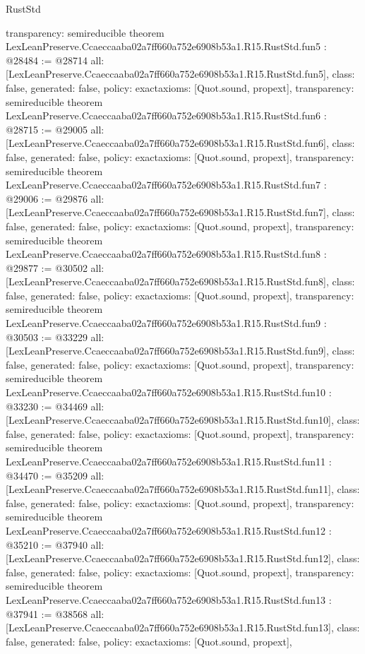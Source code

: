 \begin{lexlean}{RustStd}
\begin{coremodule}
{  transparency: semireducible
}
theorem LexLeanPreserve.Ccaeccaaba02a7ff660a752e6908b53a1.R15.RustStd.fun5 : @28484 := @28714 {
  all: [LexLeanPreserve.Ccaeccaaba02a7ff660a752e6908b53a1.R15.RustStd.fun5],
  class: false,
  generated: false,
  policy: exact{axioms: [Quot.sound, propext]},
  transparency: semireducible
}
theorem LexLeanPreserve.Ccaeccaaba02a7ff660a752e6908b53a1.R15.RustStd.fun6 : @28715 := @29005 {
  all: [LexLeanPreserve.Ccaeccaaba02a7ff660a752e6908b53a1.R15.RustStd.fun6],
  class: false,
  generated: false,
  policy: exact{axioms: [Quot.sound, propext]},
  transparency: semireducible
}
theorem LexLeanPreserve.Ccaeccaaba02a7ff660a752e6908b53a1.R15.RustStd.fun7 : @29006 := @29876 {
  all: [LexLeanPreserve.Ccaeccaaba02a7ff660a752e6908b53a1.R15.RustStd.fun7],
  class: false,
  generated: false,
  policy: exact{axioms: [Quot.sound, propext]},
  transparency: semireducible
}
theorem LexLeanPreserve.Ccaeccaaba02a7ff660a752e6908b53a1.R15.RustStd.fun8 : @29877 := @30502 {
  all: [LexLeanPreserve.Ccaeccaaba02a7ff660a752e6908b53a1.R15.RustStd.fun8],
  class: false,
  generated: false,
  policy: exact{axioms: [Quot.sound, propext]},
  transparency: semireducible
}
theorem LexLeanPreserve.Ccaeccaaba02a7ff660a752e6908b53a1.R15.RustStd.fun9 : @30503 := @33229 {
  all: [LexLeanPreserve.Ccaeccaaba02a7ff660a752e6908b53a1.R15.RustStd.fun9],
  class: false,
  generated: false,
  policy: exact{axioms: [Quot.sound, propext]},
  transparency: semireducible
}
theorem LexLeanPreserve.Ccaeccaaba02a7ff660a752e6908b53a1.R15.RustStd.fun10 : @33230 := @34469 {
  all: [LexLeanPreserve.Ccaeccaaba02a7ff660a752e6908b53a1.R15.RustStd.fun10],
  class: false,
  generated: false,
  policy: exact{axioms: [Quot.sound, propext]},
  transparency: semireducible
}
theorem LexLeanPreserve.Ccaeccaaba02a7ff660a752e6908b53a1.R15.RustStd.fun11 : @34470 := @35209 {
  all: [LexLeanPreserve.Ccaeccaaba02a7ff660a752e6908b53a1.R15.RustStd.fun11],
  class: false,
  generated: false,
  policy: exact{axioms: [Quot.sound, propext]},
  transparency: semireducible
}
theorem LexLeanPreserve.Ccaeccaaba02a7ff660a752e6908b53a1.R15.RustStd.fun12 : @35210 := @37940 {
  all: [LexLeanPreserve.Ccaeccaaba02a7ff660a752e6908b53a1.R15.RustStd.fun12],
  class: false,
  generated: false,
  policy: exact{axioms: [Quot.sound, propext]},
  transparency: semireducible
}
theorem LexLeanPreserve.Ccaeccaaba02a7ff660a752e6908b53a1.R15.RustStd.fun13 : @37941 := @38568 {
  all: [LexLeanPreserve.Ccaeccaaba02a7ff660a752e6908b53a1.R15.RustStd.fun13],
  class: false,
  generated: false,
  policy: exact{axioms: [Quot.sound, propext]},
}
\end{coremodule}
\end{lexlean}
